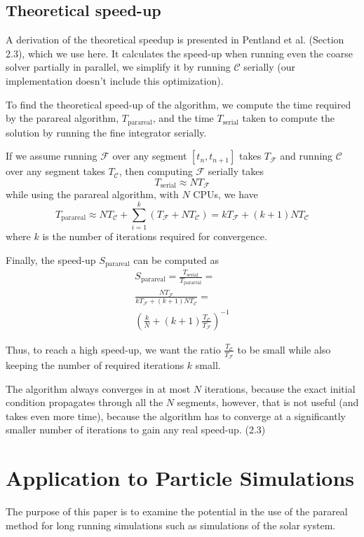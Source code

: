 \documentclass[conference]{IEEEtran}
\begin{document}
\subsection*{Theoretical speed-up}

A derivation of the theoretical speedup is presented in Pentland et al. \cite{speedup} (Section 2.3), which we use here. It calculates the speed-up when running even the coarse solver partially in parallel, we simplify it by running $\mathcal{C}$ serially (our implementation doesn't include this optimization). 

To find the theoretical speed-up of the algorithm, we compute the time required by the parareal algorithm, $T_\text{parareal}$, and the time $T_\text{serial}$ taken to compute the solution by running the fine integrator serially. 

If we assume running $\mathcal{F}$ over any segment $[t_n, t_{n+1}]$ takes $T_\mathcal{F}$ and running $\mathcal{C}$ over any segment takes $T_\mathcal{C}$, then computing $\mathcal{F}$ serially takes
$$
T_\text{serial} \approx NT_\mathcal{F}
$$
while using the parareal algorithm, with $N$ CPUs, we have
$$
T_\text{parareal} \approx NT_\mathcal{C} + \sum_{i=1}^{k}\left(T_\mathcal{F} + NT_\mathcal{C}\right) = kT_\mathcal{F} + (k+1)NT_\mathcal{C}
$$
where $k$ is the number of iterations required for convergence.

Finally, the speed-up $S_\text{parareal}$ can be computed as
\begin{multline}
S_\text{parareal} = \frac{T_\text{serial}}{T_\text{parareal}} = \\\frac{NT_\mathcal{F}}{kT_\mathcal{F} + (k+1)NT_\mathcal{C}} = \\\left(\frac{k}{N} + (k+1)\frac{T_\mathcal{C}}{T_\mathcal{F}}\right)^{-1}
\end{multline}

Thus, to reach a high speed-up, we want the ratio $\frac{T_\mathcal{C}}{T_\mathcal{F}}$ to be small while also keeping the number of required iterations $k$ small. \cite{speedup}

The algorithm always converges in at most $N$ iterations, because the exact initial condition propagates through all the $N$ segments, however, that is not useful (and takes even more time), because the algorithm has to converge at a significantly smaller number of iterations to gain any real speed-up. \cite{speedup} (2.3)

\section{Application to Particle Simulations}
The purpose of this paper is to examine the potential in the use of the parareal method for long running simulations such as simulations of the solar system. 
\end{document}
